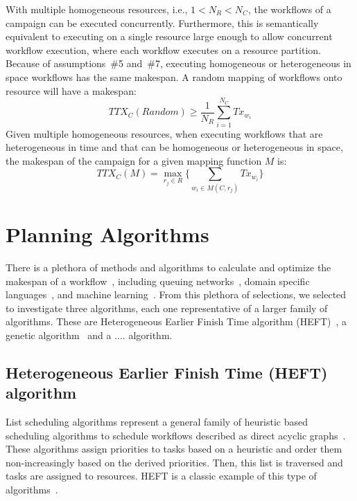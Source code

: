 With multiple homogeneous resources, i.e., $1 < N_{R} < N_{C}$, the workflows of a campaign can be executed concurrently.
Furthermore, this is semantically equivalent to executing on a single resource large enough to allow concurrent workflow execution, where each workflow executes on a resource partition. 
Because of assumptions~\#5 and~\#7, executing homogeneous or heterogeneous in space workflows has the same makespan.
A random mapping of workflows onto resource will have a makespan:
\begin{equation}
   TTX_{C}(Random) \geq \frac{1}{N_{R}}\sum_{i=1}^{N_{C}} Tx_{w_{i}} 
\end{equation}
Given multiple homogeneous resources, when executing workflows that are heterogeneous in time and that can be homogeneous or heterogeneous in space, the makespan of the campaign for a given mapping function $ M $ is:
\begin{equation}
TTX_{C}(M) = \max_{r_{j}\in R}\Big\{\sum_{w_{i}\in M(C,r_{j})}Tx_{w_{i}}\Big\}
\label{eq:makespan}
\end{equation}

\section{Planning Algorithms}
\label{sec:algo}

There is a plethora of methods and algorithms to calculate and optimize the makespan of a workflow~\cite{lu2019review}, including queuing networks~\cite{yao2019throughput,bao2019performance}, domain specific languages~\cite{carothers2017durango,maheshwari2016workflow}, and machine learning~\cite{witt2019predictive,pumma2017runtime}.
From this plethora of selections, we selected to investigate three algorithms, each one representative of a larger family of algorithms.
These are Heterogeneous Earlier Finish Time algorithm (HEFT)~\cite{topcuoglu2002performance}, a genetic algorithm~\cite{page2005algorithm} and a .... algorithm.

\subsection{Heterogeneous Earlier Finish Time (HEFT) algorithm}
\label{algo:heft}
List scheduling algorithms represent a general family of heuristic based scheduling algorithms to schedule workflows described as direct acyclic graphs~\cite{dong2006scheduling,list_sched_wiki}. 
These algorithms assign priorities to tasks based on a heuristic and order them non-increasingly based on the derived priorities.
Then, this list is traversed and tasks are assigned to resources.
HEFT is a classic example of this type of algorithms~\cite{dong2006scheduling}.

